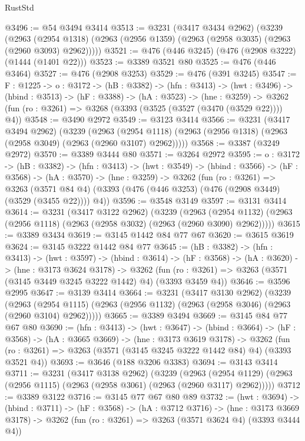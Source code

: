 \begin{lexlean}{RustStd}
\begin{coremodule}
@3496 := @54 @3494 @3414
@3513 := @3231
    (@3417 @3434 @2962)
    (@3239
      (@2963 (@2954 @1318) (@2963 (@2956 @1359) (@2963 (@2958 @3035) (@2963 (@2960 @3093) @2962)))))
@3521 := @476 (@446 @3245) (@476 (@2908 @3222) (@1444 (@1401 @22)))
@3523 := @3389 @3521 @80
@3525 := @476 (@446 @3464)
@3527 := @476 (@2908 @3253)
@3529 := @476 (@391 @3245)
@3547 := {F : @1225} ->
  {o : @3172} ->
  (hB : @3382) ->
  (hfn : @3413) ->
  (hwt : @3496) ->
  (hbind : @3513) ->
  (hF : @3388) ->
  (hA : @3523) ->
  (hne : @3259) -> @3262 (fun (ro : @3261) => @3268 (@3393 (@3525 (@3527 (@3470 (@3529 @22)))) @4))
@3548 := @3490 @2972
@3549 := @3123 @3414
@3566 := @3231
    (@3417 @3494 @2962)
    (@3239
      (@2963 (@2954 @1118) (@2963 (@2956 @1318) (@2963 (@2958 @3049) (@2963 (@2960 @3107) @2962)))))
@3568 := @3387 (@3249 @2972)
@3570 := @3389 @3444 @80
@3571 := @3264 @2972
@3595 := {o : @3172} ->
  (hB : @3382) ->
  (hfn : @3413) ->
  (hwt : @3549) ->
  (hbind : @3566) ->
  (hF : @3568) ->
  (hA : @3570) ->
  (hne : @3259) ->
  @3262
    (fun (ro : @3261) =>
    @3263 (@3571 @84 @4) (@3393 (@476 (@446 @3253) (@476 (@2908 @3449) (@3529 (@3455 @22)))) @4))
@3596 := @3548 @3149
@3597 := @3131 @3414
@3614 := @3231
    (@3417 @3122 @2962)
    (@3239
      (@2963 (@2954 @1132) (@2963 (@2956 @1118) (@2963 (@2958 @3032) (@2963 (@2960 @3090) @2962)))))
@3615 := @3389 @3434
@3619 := @3145 @1442 @84 @77 @67
@3620 := @3615 @3619
@3624 := @3145 @3222 @1442 @84 @77
@3645 := (hB : @3382) ->
  (hfn : @3413) ->
  (hwt : @3597) ->
  (hbind : @3614) ->
  (hF : @3568) ->
  (hA : @3620) ->
  (hne : @3173 @3624 @3178) ->
  @3262 (fun (ro : @3261) => @3263 (@3571 (@3145 @3449 @3245 @3222 @1442) @4) (@3393 @3459 @4))
@3646 := @3596 @2995
@3647 := @3139 @3414
@3664 := @3231
    (@3417 @3130 @2962)
    (@3239
      (@2963 (@2954 @1115) (@2963 (@2956 @1132) (@2963 (@2958 @3046) (@2963 (@2960 @3104) @2962)))))
@3665 := @3389 @3494
@3669 := @3145 @84 @77 @67 @80
@3690 := (hfn : @3413) ->
  (hwt : @3647) ->
  (hbind : @3664) ->
  (hF : @3568) ->
  (hA : @3665 @3669) ->
  (hne : @3173 @3619 @3178) ->
  @3262 (fun (ro : @3261) => @3263 (@3571 (@3145 @3245 @3222 @1442 @84) @4) (@3393 @3521 @4))
@3693 := @3646 (@188 @3206 @3383)
@3694 := @3143 @3414
@3711 := @3231
    (@3417 @3138 @2962)
    (@3239
      (@2963 (@2954 @1129) (@2963 (@2956 @1115) (@2963 (@2958 @3061) (@2963 (@2960 @3117) @2962)))))
@3712 := @3389 @3122
@3716 := @3145 @77 @67 @80 @89
@3732 := (hwt : @3694) ->
  (hbind : @3711) ->
  (hF : @3568) ->
  (hA : @3712 @3716) ->
  (hne : @3173 @3669 @3178) -> @3262 (fun (ro : @3261) => @3263 (@3571 @3624 @4) (@3393 @3444 @4))

\end{coremodule}
\end{lexlean}
